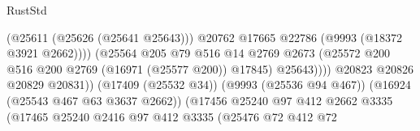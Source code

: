 \begin{lexlean}{RustStd}
\begin{coremodule}
                                                          (@25611 (@25626 (@25641 @25643)))
                                                          @20762
                                                          @17665
                                                          @22786
                                                          (@9993 (@18372 @3921 @2662))))
                                                      (@25564
                                                        @205
                                                        @79
                                                        @516
                                                        @14
                                                        @2769
                                                        @2673
                                                        (@25572
                                                          @200
                                                          @516
                                                          @200
                                                          @2769
                                                          (@16971 (@25577 @200))
                                                          @17845)
                                                        @25643))))
                                                @20823
                                                @20826
                                                @20829
                                                @20831))
                                            (@17409 (@25532 @34))
                                            (@9993 (@25536 @94 @467))
                                            (@16924 (@25543 @467 @63 @3637 @2662))
                                            (@17456
                                              @25240
                                              @97
                                              @412
                                              @2662
                                              @3335
                                              (@17465
                                                @25240
                                                @2416
                                                @97
                                                @412
                                                @3335
                                                (@25476
                                                  @72
                                                  @412
                                                  @72

\end{coremodule}
\end{lexlean}
